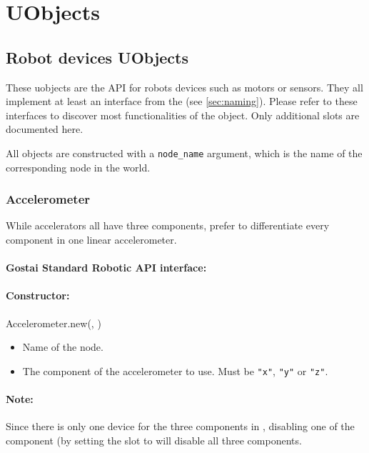\section{\webots UObjects}

\subsection{Robot devices UObjects}

These uobjects are the \urbi API for \webots robots devices such as
motors or sensors. They all implement at least an interface from the
\gsrapi (see \autoref{sec:naming}). Please refer to these interfaces
to discover most functionalities of the object. Only additional slots
are documented here.

All objects are constructed with a \verb+node_name+ argument, which is
the name of the corresponding node in the \webots world.

\subsubsection{Accelerometer}

While \webots accelerators all have three components, \urbi prefer to
differentiate every component in one linear accelerometer.

\paragraph{Gostai Standard Robotic API interface:} 

\paragraph{Constructor:} Accelerometer.new(, )

\begin{itemize}
\item {} Name of the \webots node.
\item {} The component of the \webots accelerometer
  to use. Must be \verb+"x"+, \verb+"y"+ or \verb+"z"+.
\end{itemize}

\paragraph{Note:} Since there is only one device for the three
components in \webots, disabling one of the component (by setting the
 slot to  will disable all three components.


